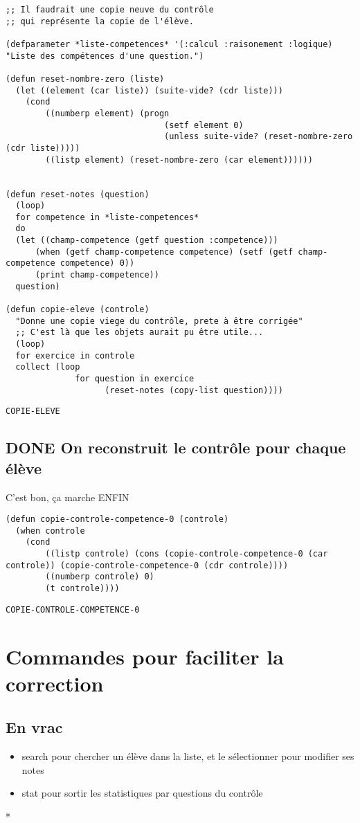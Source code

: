 \documentclass[a4paper, 11pt, DIV=18]{scrartcl}
\begin{document}
\begin{verbatim}
;; Il faudrait une copie neuve du contrôle
;; qui représente la copie de l'élève.

(defparameter *liste-competences* '(:calcul :raisonement :logique) "Liste des compétences d'une question.")

(defun reset-nombre-zero (liste)
  (let ((element (car liste)) (suite-vide? (cdr liste)))
    (cond
        ((numberp element) (progn
                                (setf element 0)
                                (unless suite-vide? (reset-nombre-zero (cdr liste)))))
        ((listp element) (reset-nombre-zero (car element))))))


(defun reset-notes (question)
  (loop)
  for competence in *liste-competences*
  do
  (let ((champ-competence (getf question :competence)))
      (when (getf champ-competence competence) (setf (getf champ-competence competence) 0))
      (print champ-competence))
  question)

(defun copie-eleve (controle)
  "Donne une copie viege du contrôle, prete à être corrigée"
  ;; C'est là que les objets aurait pu être utile...
  (loop)
  for exercice in controle
  collect (loop
              for question in exercice
                    (reset-notes (copy-list question))))
\end{verbatim}

\begin{verbatim}
COPIE-ELEVE
\end{verbatim}

\subsection{{\bfseries\sffamily DONE} On reconstruit le contrôle pour chaque élève}
\label{sec:org0c44e16}
C'est bon, ça marche ENFIN
\begin{verbatim}
(defun copie-controle-competence-0 (controle)
  (when controle
    (cond
        ((listp controle) (cons (copie-controle-competence-0 (car controle)) (copie-controle-competence-0 (cdr controle))))
        ((numberp controle) 0)
        (t controle))))
\end{verbatim}

\begin{verbatim}
COPIE-CONTROLE-COMPETENCE-0
\end{verbatim}

\section{Commandes pour faciliter la correction}
\label{sec:orgc5ef703}

\subsection{En vrac}
\label{sec:org2533b3a}

\begin{itemize}
\item search pour chercher un élève dans la liste, et le sélectionner pour modifier
ses notes
\item stat pour sortir les statistiques par questions du contrôle
\end{itemize}

*
\end{document}
